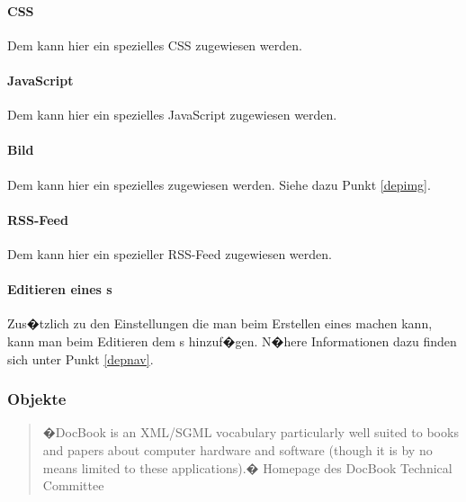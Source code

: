\paragraph{CSS}
Dem  kann hier ein spezielles CSS zugewiesen werden.

\paragraph{JavaScript}
Dem  kann hier ein spezielles JavaScript zugewiesen werden.

\paragraph{Bild}
Dem  kann hier ein spezielles  zugewiesen
werden. Siehe dazu Punkt \ref{depimg}.

\paragraph{RSS-Feed}

Dem  kann hier ein spezieller RSS-Feed zugewiesen werden.

%

\paragraph{Editieren eines s}

Zus�tzlich zu den Einstellungen die man beim Erstellen eines 
machen kann, kann man beim Editieren dem  s hinzuf�gen.
N�here Informationen dazu finden sich unter Punkt \ref{depnav}.

\subsubsection{ Objekte}
\label{sdocbookxml}

\begin{quotation}
  �DocBook is an XML/SGML vocabulary particularly well suited to books and papers
  about computer hardware and software (though it is by no means limited to these
  applications).� Homepage des DocBook Technical Committee
\end{quotation}

